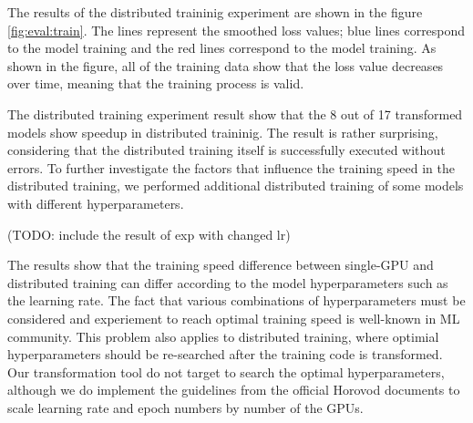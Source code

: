 The results of the distributed traininig experiment 
are shown in the figure \ref{fig:eval:train}.
The lines represent the smoothed loss values;
blue lines correspond to the \orgbf model training
and the red lines correspond to the \hvdbf model training.
As shown in the figure, all of the training data show that
the loss value decreases over time, meaning that the training
process is valid.

The distributed training experiment result show that the 8 out of 17 transformed
models show speedup in distributed traininig. The result is rather surprising,
considering that the distributed training itself is successfully executed
without errors. To further investigate the factors that influence the
training speed in the distributed training, 
we performed additional distributed training of some models with
different hyperparameters.

(TODO: include the result of exp with changed lr)

The results show that the training speed difference between single-GPU and
distributed training can differ according to the model hyperparameters
such as the learning rate. The fact that various combinations of hyperparameters
must be considered and experiement to reach optimal training speed is 
well-known in ML community. This problem also applies to distributed training,
where optimial hyperparameters should be re-searched after the training
code is transformed. Our transformation tool do not target to search the 
optimal hyperparameters, although we do implement the guidelines from the
official Horovod documents to scale learning rate and epoch numbers
by number of the GPUs.  

